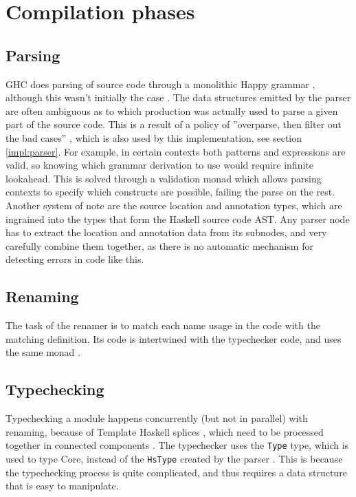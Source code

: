 \documentclass[en]{pracamgr}
\newcommand{\code}[1]{\lstinline[breaklines=true]{#1}}
\begin{document}
\section{Compilation phases}
\subsection{Parsing}\label{ghc:parsing}
GHC does parsing of source code through a monolithic Happy grammar \cite{Happy}, although this wasn't initially the case \cite{Jones1993TheGH}.
The data structures emitted by the parser are often ambiguous as to which production was actually used to parse a given part of the source code.
This is a result of a policy of ''overparse, then filter out the bad cases'' \cite{ParserWiki}, 
which is also used by this implementation, see section \ref{impl:parser}.
For example, in certain contexts both patterns and expressions are valid, so knowing which grammar derivation to use would require infinite lookahead.
This is solved through a validation monad which allows parsing contexts to specify which constructs are possible, failing the parse on the rest.
Another system of note are the source location and annotation types, which are ingrained into the types that form the Haskell source code AST.
Any parser node has to extract the location and annotation data from its subnodes, and very carefully combine them together,
as there is no automatic mechanism for detecting errors in code like this.

\subsection{Renaming}
The task of the renamer is to match each name usage in the code with the matching definition. 
Its code is intertwined with the typechecker code, and uses the same monad \cite{RenamerWiki}.

\subsection{Typechecking}
Typechecking a module happens concurrently (but not in parallel) with renaming, because of Template Haskell splices \cite{TemplateHaskellDocs},
which need to be processed together in connected components \cite{TypecheckerWiki}.
The typechecker uses the \code{Type} type, which is used to type Core, instead of the \code{HsType} created by the parser \cite{TypecheckerWiki}.
This is because the typechecking process is quite complicated, and thus requires a data structure that is easy to manipulate.
\end{document}
